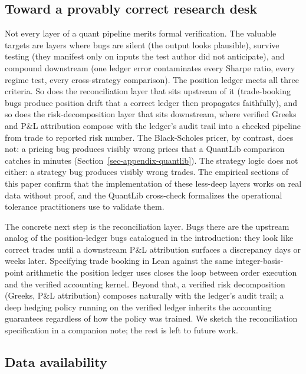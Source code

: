 \documentclass[
  11pt,
  letterpaper,
  DIV=12,
  numbers=noendperiod]{scrartcl}
\numberwithin{equation}{section}
\numberwithin{figure}{section}
\numberwithin{table}{section}
\begin{document}
\subsection{Toward a provably correct research
desk}\label{sec-extensions}

Not every layer of a quant pipeline merits formal verification. The
valuable targets are layers where bugs are silent (the output looks
plausible), survive testing (they manifest only on inputs the test
author did not anticipate), and compound downstream (one ledger error
contaminates every Sharpe ratio, every regime test, every cross-strategy
comparison). The position ledger meets all three criteria. So does the
reconciliation layer that sits upstream of it (trade-booking bugs
produce position drift that a correct ledger then propagates
faithfully), and so does the risk-decomposition layer that sits
downstream, where verified Greeks and P\&L attribution compose with the
ledger's audit trail into a checked pipeline from trade to reported risk
number. The Black-Scholes pricer, by contrast, does not: a pricing bug
produces visibly wrong prices that a QuantLib comparison catches in
minutes (Section~\ref{sec-appendix-quantlib}). The strategy logic does
not either: a strategy bug produces visibly wrong trades. The empirical
sections of this paper confirm that the implementation of these
less-deep layers works on real data without proof, and the QuantLib
cross-check formalizes the operational tolerance practitioners use to
validate them.

The concrete next step is the reconciliation layer. Bugs there are the
upstream analog of the position-ledger bugs catalogued in the
introduction: they look like correct trades until a downstream P\&L
attribution surfaces a discrepancy days or weeks later. Specifying trade
booking in Lean against the same integer-basis-point arithmetic the
position ledger uses closes the loop between order execution and the
verified accounting kernel. Beyond that, a verified risk decomposition
(Greeks, P\&L attribution) composes naturally with the ledger's audit
trail; a deep hedging 
policy running on the verified ledger inherits the accounting guarantees
regardless of how the policy was trained. We sketch the reconciliation
specification in a companion note; the rest is left to future work.

\subsection{Data availability}\label{sec-data-availability}
\end{document}
